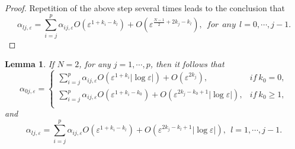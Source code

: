 \documentclass[11pt,reqno]{article}
\newtheorem{lemma}[teo]{Lemma}
\numberwithin{equation}{section}
\newcommand\e\varepsilon
\begin{document}
\begin{proof}
 Repetition of the above step  several times leads to the conclusion that
\begin{equation}
    \alpha_{lj,\e}=\sum_{i=j}^{ p}\alpha_{ij,\e}O(\e^{1+{ k_i}-{ k_l}})+O(\e^{\frac{N-1}{2}+2{ k_j}-{ k_l}}),\ \ for \ \ any\ \ l=0,\cdots,j-1.
\end{equation}
\end{proof}
     \begin{lemma}\label{2thsa}
If $N=2$,
for any $j=1,\cdots,p$, then it follows that
   \begin{equation}\label{eq0301-2}
 \alpha_{0j,\e}=
    \begin{cases}
       \displaystyle{ \sum_{i=j}^{p}}\alpha_{ij,\e}O(\e^{1+{ k_i}}|\log\e|)+O(\e^{2{ k_j}}), &if\ k_0=0,\\
      \displaystyle  { \sum_{i=j}^{p}}\alpha_{ij,\e}O(\e^{1+{k_i-k_0}})+O(\e^{2{ k_j}-{ k_0}+1}|\log\e|), &if\ k_0\ge 1,\\
    \end{cases}
\end{equation}
and
\begin{equation}
    \alpha_{lj,\e}={ \sum_{i=j}^{p}}\alpha_{ij,\e}O(\e^{1+{ k_i-k_l}})+O(\e^{2{ k_j}-{ k_l}+1}|\log\e|),\ \ l=1,\cdots,j-1.
\end{equation}
\end{lemma}
\end{document}
